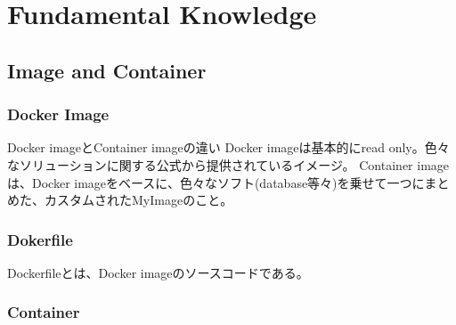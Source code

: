 \documentclass[10pt,a4j,openany,dvipdfmx]{jsarticle}
\begin{document}
\section{Fundamental Knowledge} %
\label{sec:fundamental_knowledge}

\subsection{Image and Container} %
\label{sub:image_and_container}

\subsubsection{Docker Image} %
\label{ssub:docker_image}




\begin{skybox}{Docker imageとContainer imageの違い}
Docker imageは基本的にread only。色々なソリューションに関する公式から提供されているイメージ。
Container imageは、Docker imageをベースに、色々なソフト(database等々)を乗せて一つにまとめた、カスタムされたMyImageのこと。
\end{skybox}

\subsubsection{Dokerfile} %
\label{ssub:dokerfile}

\begin{tcolorbox}[
title=Dockerfileについて, fonttitle=\bfseries]
Dockerfileとは、Docker imageのソースコードである。
\end{tcolorbox}

\subsubsection{Container} %
\label{ssub:container}





\end{document}
